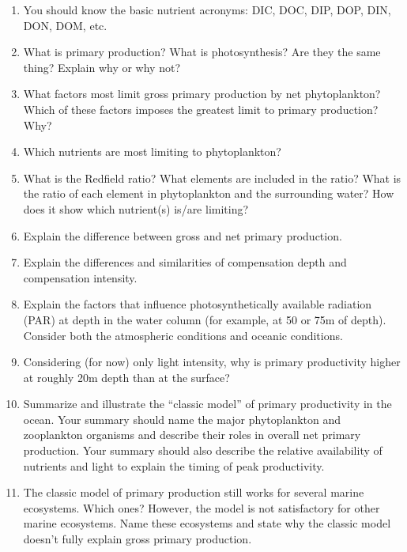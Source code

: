 \documentclass[nofonts, letterpaper]{tufte-handout}
\begin{document}
\begin{enumerate}

\item
  You should know the basic nutrient acronyms: DIC, DOC, DIP, DOP, DIN,
  DON, DOM, etc.

\item
  What is primary production? What is photosynthesis? Are they the same
  thing? Explain why or why not?

\item
  What factors most limit gross primary production by net
  phytoplankton? Which of these factors imposes the greatest limit to
  primary production? Why?

\item
  Which nutrients are most limiting to phytoplankton?

\item What is the Redfield ratio? What elements are included in the ratio?  What is the ratio of each element in phytoplankton and the surrounding water?  How does it show which nutrient(s) is/are limiting?

\item
  Explain the difference between gross and net primary production.
\item
  Explain the differences and similarities of compensation depth and
  compensation intensity.
\item
  Explain the factors that influence photosynthetically available
  radiation (PAR) at depth in the water column (for example, at 50 or
  75m of depth). Consider both the atmospheric conditions and oceanic
  conditions.
\item
  Considering (for now) only light intensity, why is primary
  productivity higher at roughly 20m depth than at the surface?


\item
  Summarize and illustrate the ``classic model'' of primary productivity in the ocean. Your
  summary should name the major phytoplankton and zooplankton organisms
  and describe their roles in overall net primary production. Your
  summary should also describe the relative availability of nutrients
  and light to explain the timing of peak productivity.
  
\item
  The classic model of primary production still works for several marine
  ecosystems. Which ones? However, the model is not satisfactory for
  other marine ecosystems. Name these ecosystems and state why the
  classic model doesn't fully explain gross primary production.
  

\end{enumerate}
\end{document}
